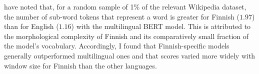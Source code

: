 

\textcite[3]{Virtanen2019} have noted that, for a random sample of 1\% of the relevant
Wikipedia dataset, the number of sub-word tokens that represent a word
is greater for Finnish ($1.97$) than for English ($1.16$) with the multilingual BERT model.
This is attributed to the morphological complexity of Finnish and its comparatively
small fraction of the model's vocabulary.
Accordingly, I found that Finnish-specific models generally outperformed multilingual
ones and that scores varied more widely with window size for Finnish than the other
languages.
